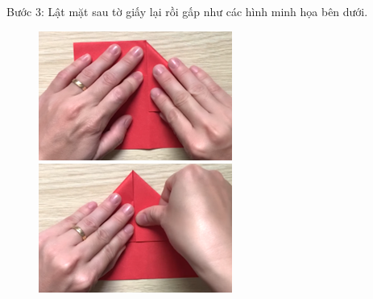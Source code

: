 \begin{multicols}{2}
\begin{figure}[H]
		\vspace*{-15pt}
	\end{figure}
	Bước $3$: Lật mặt sau tờ giấy lại rồi gấp như các hình minh họa bên dưới. 
	\begin{figure}[H]
		\vspace*{5pt}
		\centering
		\captionsetup{labelformat= empty, justification=centering}
		\includegraphics[height= 0.327\linewidth]{23}
		\includegraphics[height= 0.327\linewidth]{24}
		

\end{figure}
\end{multicols}
